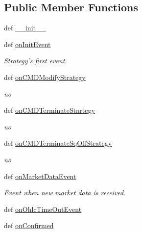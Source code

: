 \subsection*{Public Member Functions}
\begin{DoxyCompactItemize}
\item 
def \hyperlink{classsampleStrategy_1_1sample_a9181fa2dc3d56ebe267718817dbc6941}{\_\-\_\-init\_\-\_\-}
\item 
def \hyperlink{classsampleStrategy_1_1sample_a412c1e16766e2af518a879c781dfb70c}{onInitEvent}
\begin{DoxyCompactList}\small\item\em Strategy's first event. \item\end{DoxyCompactList}\item 
def \hyperlink{classsampleStrategy_1_1sample_afba39e39a71fd78abc113b6bdcbd0c7e}{onCMDModifyStrategy}
\begin{DoxyCompactList}\small\item\em no \item\end{DoxyCompactList}\item 
def \hyperlink{classsampleStrategy_1_1sample_aae075263f0648af98b9222b1f099bda0}{onCMDTerminateStartegy}
\begin{DoxyCompactList}\small\item\em no \item\end{DoxyCompactList}\item 
def \hyperlink{classsampleStrategy_1_1sample_add6cff726b92c0b035ffe094989b5dbb}{onCMDTerminateSqOffStrategy}
\begin{DoxyCompactList}\small\item\em no \item\end{DoxyCompactList}\item 
def \hyperlink{classsampleStrategy_1_1sample_a3295ea611070075a0b28065e0d60cd4c}{onMarketDataEvent}
\begin{DoxyCompactList}\small\item\em Event when new market data is received. \item\end{DoxyCompactList}\item 
def \hyperlink{classsampleStrategy_1_1sample_ab8d041be41bfa4e69b0a4953fc81458b}{onOhlcTimeOutEvent}
\item 
def \hyperlink{classsampleStrategy_1_1sample_a0f8cc6ff13892e5a0c15abc506de2d24}{onConfirmed}

\end{DoxyCompactItemize}
